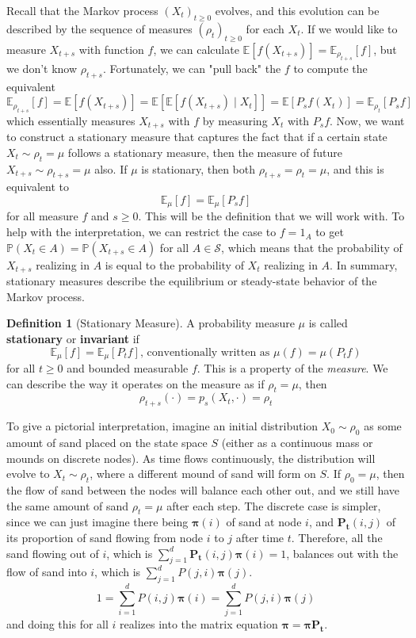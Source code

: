 \documentclass{article}
\theoremstyle{definition}
\theoremstyle{remark}
\theoremstyle{definition}
\newtheorem{definition}{Definition}[section]
\begin{document}
Recall that the Markov process $(X_t)_{t \geq 0}$ evolves, and this evolution can be described by the sequence of measures $(\rho_t)_{t \geq 0}$ for each $X_t$. If we would like to measure $X_{t + s}$ with function $f$, we can calculate $\mathbb{E}[f(X_{t + s})] = \mathbb{E}_{\rho_{t + s}} [f]$, but we don't know $\rho_{t + s}$. Fortunately, we can "pull back" the $f$ to compute the equivalent 
\[\mathbb{E}_{\rho_{t + s}} [f] = \mathbb{E}[f(X_{t + s})] = \mathbb{E}[\mathbb{E}[ f(X_{t + s}) \mid X_t]] = \mathbb{E}[P_s f (X_t)] = \mathbb{E}_{\rho_{t}} [ P_s f] \]
which essentially measures $X_{t + s}$ with $f$ by measuring $X_t$ with $P_s f$. Now, we want to construct a stationary measure that captures the fact that if a certain state $X_t \sim \rho_t = \mu$ follows a stationary measure, then the measure of future $X_{t + s} \sim \rho_{t + s} = \mu$ also. If $\mu$ is stationary, then both $\rho_{t + s} = \rho_t = \mu$, and this is equivalent to
\[\mathbb{E}_\mu [f] = \mathbb{E}_\mu [P_s f]\]
for all measure $f$ and $s \geq 0$. This will be the definition that we will work with. To help with the interpretation, we can restrict the case to $f = 1_A$ to get $\mathbb{P}(X_t \in A) = \mathbb{P}(X_{t + s} \in A)$ for all $A \in \mathcal{S}$, which means that the probability of $X_{t + s}$ realizing in $A$ is equal to the probability of $X_t$ realizing in $A$. In summary, stationary measures describe the equilibrium or steady-state behavior of the Markov process.  

\begin{definition}[Stationary Measure]
A probability measure $\mu$ is called \textbf{stationary} or \textbf{invariant} if 
\[\mathbb{E}_\mu[f] = \mathbb{E}_\mu [P_t f] \text{, conventionally written as } \mu(f) = \mu(P_t f)\]
for all $t \geq 0$ and bounded measurable $f$. This is a property of the \textit{measure}. We can describe the way it operates on the measure as if $\rho_t = \mu$, then 
\[\rho_{t + s} (\cdot) = p_s (X_t, \cdot) = \rho_t\]
\end{definition}

To give a pictorial interpretation, imagine an initial distribution $X_0 \sim \rho_0$ as some amount of sand placed on the state space $S$ (either as a continuous mass or mounds on discrete nodes). As time flows continuously, the distribution will evolve to $X_t \sim \rho_t$, where a different mound of sand will form on $S$. If $\rho_0 = \mu$, then the flow of sand between the nodes will balance each other out, and we still have the same amount of sand $\rho_t = \mu$ after each step. The discrete case is simpler, since we can just imagine there being $\boldsymbol{\pi} (i)$ of sand at node $i$, and $\mathbf{P_t} (i, j)$ of its proportion of sand flowing from node $i$ to $j$ after time $t$. Therefore, all the sand flowing out of $i$, which is $\sum_{j=1}^d \mathbf{P_t} (i, j) \boldsymbol{\pi}(i) = 1$, balances out with the flow of sand into $i$, which is $\sum_{j=1}^d P(j, i) \boldsymbol{\pi}(j)$. 
\[1 = \sum_{i=1}^d P(i, j) \boldsymbol{\pi}(i) = \sum_{j=1}^d P(j, i) \boldsymbol{\pi}(j)\]
and doing this for all $i$ realizes into the matrix equation $\boldsymbol{\pi} = \boldsymbol{\pi} \mathbf{P_t}$. 
\end{document}
